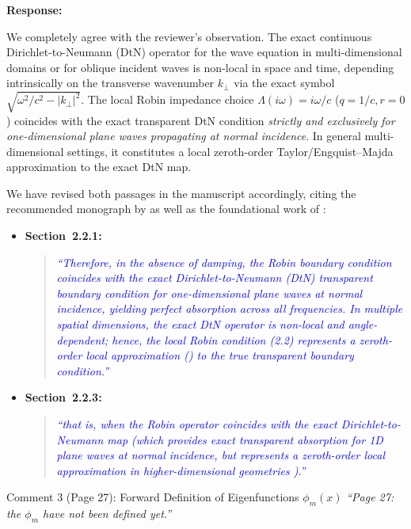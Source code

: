 \documentclass[11pt,a4paper]{article}
\newenvironment{response}{
    \par\vspace{1mm}\noindent\textbf{\textcolor{responseframe}{Response:}}\par\vspace{1mm}
}{
    \par\vspace{3mm}
}
\begin{document}
\begin{response}
We completely agree with the reviewer's observation. The exact continuous Dirichlet-to-Neumann (DtN) operator for the wave equation in multi-dimensional domains or for oblique incident waves is non-local in space and time, depending intrinsically on the transverse wavenumber $k_\perp$ via the exact symbol $\sqrt{\omega^2/c^2 - |k_\perp|^2}$. The local Robin impedance choice $\Lambda(i\omega) = i\omega/c$ ($q=1/c, r=0$) coincides with the exact transparent DtN condition \emph{strictly and exclusively for one-dimensional plane waves propagating at normal incidence}. In general multi-dimensional settings, it constitutes a local zeroth-order Taylor/Engquist--Majda approximation to the exact DtN map.

We have revised both passages in the manuscript accordingly, citing the recommended monograph by \citet{dolean_introduction_2015} as well as the foundational work of \citet{engquist_absorbing_1977}:
\begin{itemize}[leftmargin=*]
    \item \textbf{Section~2.2.1:}
    \begin{quote}
    \textcolor{blue}{\emph{``Therefore, in the absence of damping, the Robin boundary condition coincides with the exact Dirichlet-to-Neumann (DtN) transparent boundary condition for one-dimensional plane waves at normal incidence, yielding perfect absorption across all frequencies. In multiple spatial dimensions, the exact DtN operator is non-local and angle-dependent; hence, the local Robin condition (2.2) represents a zeroth-order local approximation (\cite{engquist_absorbing_1977,dolean_introduction_2015}) to the true transparent boundary condition.''}}
    \end{quote}
    \item \textbf{Section~2.2.3:}
    \begin{quote}
    \textcolor{blue}{\emph{``that is, when the Robin operator coincides with the exact Dirichlet-to-Neumann map (which provides exact transparent absorption for 1D plane waves at normal incidence, but represents a zeroth-order local approximation in higher-dimensional geometries \cite{dolean_introduction_2015}).''}}
    \end{quote}
\end{itemize}
\end{response}

\vspace{2mm}
\begin{revcomment}{Comment 3 (Page 27): Forward Definition of Eigenfunctions $\phi_m(x)$}
\emph{``Page 27: the $\phi_m$ have not been defined yet.''}
\end{revcomment}
\end{document}
